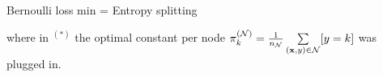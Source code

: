 \documentclass[11pt,compress,t,notes=noshow, xcolor=table]{beamer}
\begin{document}
\begin{vbframe}{Bernoulli loss min = Entropy splitting}
\begin{footnotesize}
where in $^{(*)}$ the optimal constant per node $\pi_k^{(\mathcal{N})} = \frac{1}{n_{\mathcal{N}}} \sum\limits_{(\mathbf{x},y) \in \mathcal{N}} [y = k]$ was plugged in. 
\end{footnotesize}



\end{vbframe}
\end{document}
